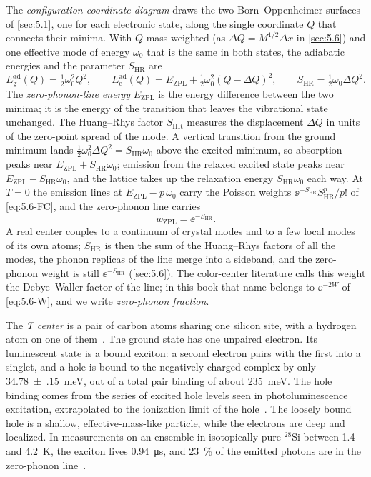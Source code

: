 The \emph{configuration-coordinate diagram} draws the two Born--Oppenheimer surfaces of \cref{sec:5.1}, one for each electronic state, along the single coordinate $Q$ that connects their minima. With $Q$ mass-weighted (as $\Delta Q = M^{1/2}\Delta x$ in \cref{sec:5.6}) and one effective mode of energy $\omega_0$ that is the same in both states, the adiabatic energies and the parameter $S_{\mathrm{HR}}$ are
\begin{equation}
  E^{\mathrm{ad}}_{\mathrm{g}}(Q) = \tfrac12\omega_0^2Q^2 , \qquad
  E^{\mathrm{ad}}_{\mathrm{e}}(Q) = E_{\mathrm{ZPL}} + \tfrac12\omega_0^2(Q - \Delta Q)^2 , \qquad
  S_{\mathrm{HR}} = \tfrac12\omega_0\Delta Q^2 .
  \label{eq:7.4-cc}
\end{equation}
The \emph{zero-phonon-line energy} $E_{\mathrm{ZPL}}$ is the energy difference between the two minima; it is the energy of the transition that leaves the vibrational state unchanged. The Huang--Rhys factor $S_{\mathrm{HR}}$ measures the displacement $\Delta Q$ in units of the zero-point spread of the mode. A vertical transition from the ground minimum lands $\tfrac12\omega_0^2\Delta Q^2 = S_{\mathrm{HR}}\omega_0$ above the excited minimum, so absorption peaks near $E_{\mathrm{ZPL}} + S_{\mathrm{HR}}\omega_0$; emission from the relaxed excited state peaks near $E_{\mathrm{ZPL}} - S_{\mathrm{HR}}\omega_0$, and the lattice takes up the relaxation energy $S_{\mathrm{HR}}\omega_0$ each way. At $T = 0$ the emission lines at $E_{\mathrm{ZPL}} - p\,\omega_0$ carry the Poisson weights $\ee^{-S_{\mathrm{HR}}}S_{\mathrm{HR}}^p/p!$ of \cref{eq:5.6-FC}, and the zero-phonon line carries
\begin{equation}
  w_{\mathrm{ZPL}} = \ee^{-S_{\mathrm{HR}}} .
  \label{eq:7.4-zpl}
\end{equation}
A real center couples to a continuum of crystal modes and to a few local modes of its own atoms; $S_{\mathrm{HR}}$ is then the sum of the Huang--Rhys factors of all the modes, the phonon replicas of the line merge into a sideband, and the zero-phonon weight is still $\ee^{-S_{\mathrm{HR}}}$ (\cref{sec:5.6}). The color-center literature calls this weight the Debye--Waller factor of the line; in this book that name belongs to $\ee^{-2W}$ of \cref{eq:5.6-W}, and we write \emph{zero-phonon fraction}.

The \emph{T center} is a pair of carbon atoms sharing one silicon site, with a hydrogen atom on one of them~\cite{bergeron2020characterization}. The ground state has one unpaired electron. Its luminescent state is a bound exciton: a second electron pairs with the first into a singlet, and a hole is bound to the negatively charged complex by only \SI{34.78(15)}{meV}, out of a total pair binding of about \SI{235}{meV}. The hole binding comes from the series of excited hole levels seen in photoluminescence excitation, extrapolated to the ionization limit of the hole~\cite[Sect.~IV]{bergeron2020characterization}. The loosely bound hole is a shallow, effective-mass-like particle, while the electrons are deep and localized. In measurements on an ensemble in isotopically pure $^{28}$Si between 1.4 and \SI{4.2}{K}, the exciton lives \SI{0.94}{\micro s}, and \SI{23}{\percent} of the emitted photons are in the zero-phonon line~\cite{bergeron2020silicon}.

